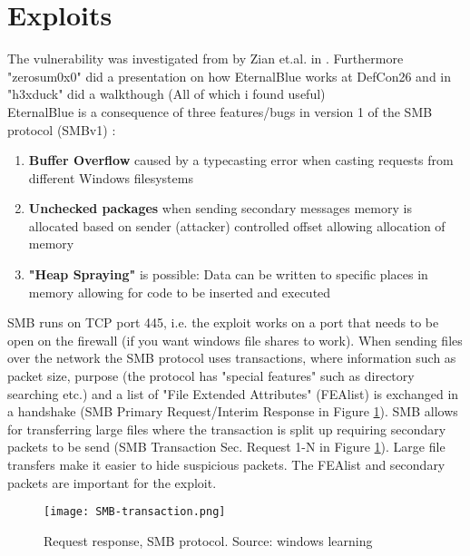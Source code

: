 \documentclass[
	letterpaper, %
	10pt, %
	unnumberedsections, %
	twoside, %
]{LTJournalArticle}
\begin{document}
\section{Exploits} 

The vulnerability was investigated from by Zian et.al. in \cite{Zian}. Furthermore "zerosum0x0" did a presentation on how EternalBlue works at DefCon26 \cite{zerosum0x0-defcon26} and in \cite{h3xduck} "h3xduck" did a walkthough (All of which i found useful) \\


EternalBlue is a consequence of three features/bugs in version 1 of the SMB protocol (SMBv1) \cite{Koczwara-medium} : 

\begin{enumerate}
	\item{ \textbf{Buffer Overflow} caused by a typecasting error when casting requests from different Windows filesystems}
	\item{ \textbf{Unchecked packages} when sending secondary messages memory is allocated based on sender (attacker) controlled offset allowing allocation of memory}
	\item{ \textbf{"Heap Spraying"} is possible: Data can be written to specific places in memory allowing for code to be inserted and executed}
\end{enumerate}


SMB runs on TCP port 445, i.e. the  exploit works on a port that needs to be open on the firewall (if you want windows file shares to work).
When sending files over the network the SMB protocol uses transactions, where information such as packet size, purpose (the protocol has "special features" such as directory searching etc.) and a list of "File Extended Attributes" (FEAlist) is exchanged in a handshake (SMB Primary Request/Interim Response in Figure \ref{fig:SMB-transaction}). 
\newline{}
SMB allows for transferring large files where the transaction is split up requiring secondary packets to be send (SMB Transaction Sec. Request 1-N in Figure \ref{fig:SMB-transaction}). Large file transfers make it easier to hide suspicious packets.  
\newline
The FEAlist and secondary packets are important for the exploit.


\begin{figure} %
	\texttt{[image: SMB-transaction.png]}
	\caption{Request response, SMB protocol. Source: windows learning }
	\label{fig:SMB-transaction}
\end{figure}
\end{document}
